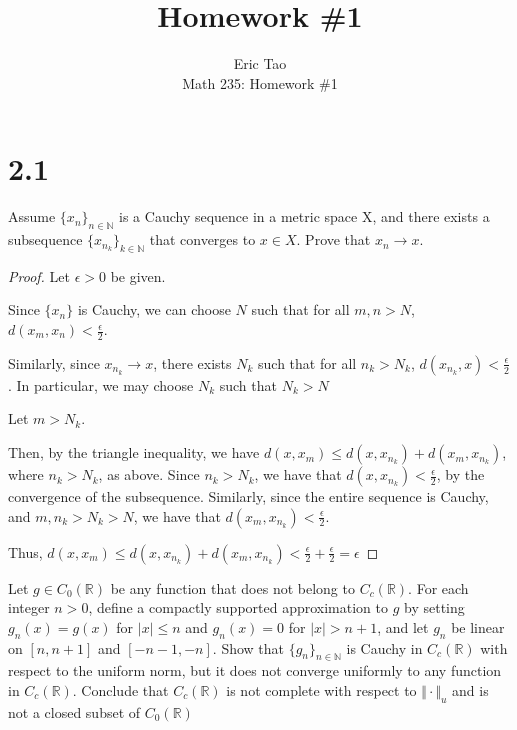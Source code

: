 \documentclass[10pt]{article}
\newenvironment{problem}[2][Problem]{\begin{trivlist}
\item[\hskip \labelsep {\bfseries #1}\hskip \labelsep {\bfseries #2.}]}{\end{trivlist}}
\begin{document}
 
\title{Homework \#1}
\author{Eric Tao\\
Math 235: Homework \#1}
\maketitle
 
\section*{2.1}

\begin{problem}{1.1.20}
Assume ${\{x_n\}_{n\in\mathbb{N}}}$ is a Cauchy sequence in a metric space X, and there exists a subsequence ${\{x_{n_k}\}_{k\in\mathbb{N}}}$  that converges to $x \in X$. Prove that $x_n \rightarrow x$.
\end{problem}

\begin{proof}[Proof]
Let $ \epsilon > 0$ be given.

Since ${\{x_n\}}$ is Cauchy, we can choose $N$ such that for all $ m,n > N$, $d(x_m,x_n) < \frac{\epsilon}{2}$.

Similarly, since $x_{n_k} \rightarrow x$, there exists $N_k$ such that for all $n_k > N_k$, $d(x_{n_k},x) < \frac{\epsilon}{2}$. In particular, we may choose $N_k$ such that $N_k > N$

Let $m > N_k$. 

Then, by the triangle inequality, we have $d(x, x_m) \leq d(x,x_{n_k}) + d(x_m,x_{n_k})$, where $n_k > N_k$, as above. Since $n_k > N_k$, we have that $d(x,x_{n_k}) < \frac{\epsilon}{2}$, by the convergence of the subsequence.
Similarly, since the entire sequence is Cauchy, and $m,n_k > N_k > N$, we have that $d(x_m,x_{n_k}) < \frac{\epsilon}{2}$.

Thus, $d(x, x_m) \leq d(x,x_{n_k}) + d(x_m,x_{n_k}) <  \frac{\epsilon}{2} +  \frac{\epsilon}{2} = \epsilon $ 

\end{proof}

\begin{problem}{1.3.8}
Let $g \in C_0(\mathbb{R})$ be any function that does not belong to $C_c(\mathbb{R})$. For each integer $n > 0$, define a compactly supported approximation to $g$ by setting $g_n(x) = g(x)$ for $|x| \leq n$ and $g_n(x) = 0$ for $|x| > n+1$, and let $g_n$ be linear on $[n,n+1]$ and $[-n-1, -n]$. Show that $\{g_n\}_{n \in \mathbb{N}}$ is Cauchy in $C_c(\mathbb{R})$ with respect to the uniform norm, but it does not converge uniformly to any function in $C_c(\mathbb{R})$. Conclude that $C_c(\mathbb{R})$ is not complete with respect to $\Vert \cdot \Vert_u$ and is not a closed subset of $C_0(\mathbb{R})$
\end{problem}
\end{document}
